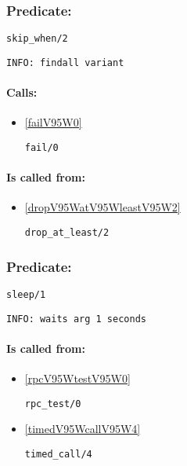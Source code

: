 \subsubsection{Predicate:} \label{skipV95WwhenV95W2}

\begin{verbatim}
skip_when/2
\end{verbatim}

{\small \begin{verbatim}
INFO: findall variant

\end{verbatim}}
\paragraph{Calls:} 
\begin{itemize}
\item \ref{failV95W0} 
\begin{verbatim}
fail/0
\end{verbatim}

\end{itemize}
\paragraph{Is called from:} 
\begin{itemize}
\item \ref{dropV95WatV95WleastV95W2} 
\begin{verbatim}
drop_at_least/2
\end{verbatim}

\end{itemize}

\subsubsection{Predicate:} \label{sleepV95W1}

\begin{verbatim}
sleep/1
\end{verbatim}

{\small \begin{verbatim}
INFO: waits arg 1 seconds

\end{verbatim}}
\paragraph{Is called from:} 
\begin{itemize}
\item \ref{rpcV95WtestV95W0} 
\begin{verbatim}
rpc_test/0
\end{verbatim}

\item \ref{timedV95WcallV95W4} 
\begin{verbatim}
timed_call/4
\end{verbatim}

\end{itemize}

